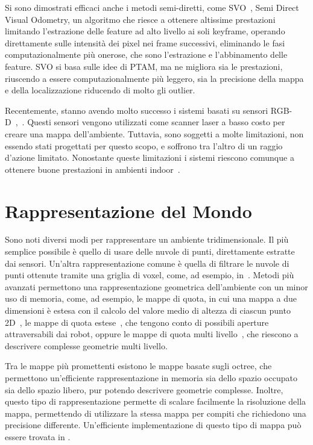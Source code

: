 Si sono dimostrati efficaci anche i metodi semi-diretti, come SVO~\cite{Forster2014ICRA}, Semi Direct Visual Odometry, un algoritmo che riesce a ottenere altissime prestazioni limitando l'estrazione delle feature ad alto livello ai soli keyframe, operando direttamente sulle intensità dei pixel nei frame successivi, eliminando le fasi computazionalmente più onerose, che sono l'estrazione e l'abbinamento delle feature. SVO si basa sulle idee di PTAM, ma ne migliora sia le prestazioni, riuscendo a essere computazionalmente più leggero, sia la precisione della mappa e della localizzazione riducendo di molto gli outlier.

Recentemente, stanno avendo molto successo i sistemi basati su sensori RGB-D~\cite{izadi2011kinectfusion},~\cite{henry2012rgb}. Questi sensori vengono utilizzati come scanner laser a basso costo per creare una mappa dell'ambiente. Tuttavia, sono soggetti a molte limitazioni, non essendo stati progettati per questo scopo, e soffrono tra l'altro di un raggio d'azione limitato. Nonostante queste limitazioni i sistemi riescono comunque a ottenere buone prestazioni in ambienti indoor~\cite{sturm2012benchmark}.

\section{Rappresentazione del Mondo}

Sono noti diversi modi per rappresentare un ambiente tridimensionale.
Il più semplice possibile è quello di usare delle nuvole di punti, direttamente estratte dai sensori. Un'altra rappresentazione comune è quella di filtrare le nuvole di punti ottenute tramite una griglia di voxel, come, ad esempio, in~\cite{30724}.
Metodi più avanzati permettono una rappresentazione geometrica dell'ambiente con un minor uso di memoria, come, ad esempio, le mappe di quota, in cui una mappa a due dimensioni è estesa con il calcolo del valore medio di altezza di ciascun punto 2D~\cite{herbert1989terrain}, le mappe di quota estese~\cite{pfaff2007efficient}, che tengono conto di possibili aperture attraversabili dai robot, oppure le mappe di quota multi livello~\cite{4058725}, che riescono a descrivere complesse geometrie multi livello.

Tra le mappe più promettenti esistono le mappe basate sugli octree, che permettono un'efficiente rappresentazione in memoria sia dello spazio occupato sia dello spazio libero, pur potendo descrivere geometrie complesse. Inoltre, questo tipo di rappresentazione permette di scalare facilmente la risoluzione della mappa, permettendo di utilizzare la stessa mappa per compiti che richiedono una precisione differente.
Un'efficiente implementazione di questo tipo di mappa può essere trovata in \cite{hornung13auro}.

